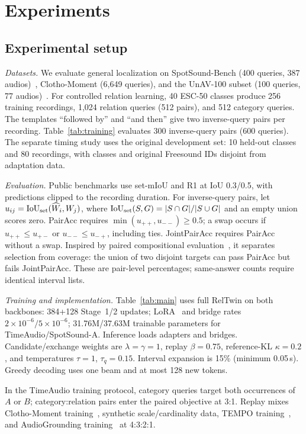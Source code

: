 \section{Experiments}

\subsection{Experimental setup}
\label{sec:protocol}
\textit{Datasets.}
We evaluate general localization on SpotSound-Bench (400 queries, 387 audios)~\cite{sun2026spotsound}, Clotho-Moment (6,649 queries), and the UnAV-100 subset (100 queries, 77 audios)~\cite{munakata2025amr}. For controlled relation learning, 40 ESC-50 classes produce 256 training recordings, 1,024 relation queries (512 pairs), and 512 category queries. The templates ``followed by'' and ``and then'' give two inverse-query pairs per recording. Table~\ref{tab:training} evaluates 300 inverse-query pairs (600 queries). The separate timing study uses the original development set: 10 held-out classes and 80 recordings, with classes and original Freesound IDs disjoint from adaptation data.

\textit{Evaluation.}
Public benchmarks use set-mIoU and R1 at IoU 0.3/0.5, with predictions clipped to the recording duration. For inverse-query pairs, let $u_{ij}=\operatorname{IoU}_{\mathrm{set}}(\widehat W_i,W_j)$, where $\operatorname{IoU}_{\mathrm{set}}(S,G)=|S\cap G|/|S\cup G|$ and an empty union scores zero. PairAcc requires $\min(u_{++},u_{--})\geq0.5$; a swap occurs if $u_{++}\leq u_{+-}$ or $u_{--}\leq u_{-+}$, including ties. JointPairAcc requires PairAcc without a swap. Inspired by paired compositional evaluation~\cite{thrush2022winoground}, it separates selection from coverage: the union of two disjoint targets can pass PairAcc but fails JointPairAcc. These are pair-level percentages; same-answer counts require identical interval lists.

\textit{Training and implementation.}
Table~\ref{tab:main} uses full RelTwin on both backbones: 384+128 Stage~1/2 updates; LoRA~\cite{hu2022lora} and bridge rates $2\times10^{-6}/5\times10^{-6}$; 31.76M/37.63M trainable parameters for TimeAudio/SpotSound-A. Inference loads adapters and bridges. Candidate/exchange weights are $\lambda=\gamma=1$, replay $\beta=0.75$, reference-KL $\kappa=0.2$, and temperatures $\tau=1$, $\tau_q=0.15$. Interval expansion is 15\% (minimum 0.05\,s). Greedy decoding uses one beam and at most 128 new tokens.

In the TimeAudio training protocol, category queries target both occurrences of $A$ or $B$; category:relation pairs enter the paired objective at 3:1. Replay mixes Clotho-Moment training~\cite{munakata2025amr}, synthetic scale/cardinality data, TEMPO training~\cite{kulkarni2026tempo}, and AudioGrounding training~\cite{xu2021grounding} at 4:3:2:1.

